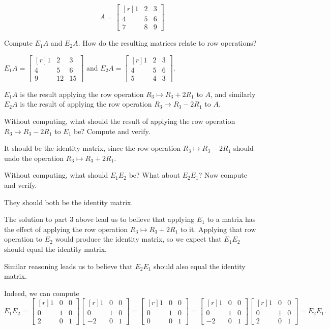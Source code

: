 \documentclass{problemset}
\newcommand{\mat}[1]{\begin{bmatrix*}[r]#1\end{bmatrix*}}
\begin{document}
	\[
		A=\mat{1&2&3\\4&5&6\\7&8&9}
	\]
	\begin{parts}[resume]
		\item Compute $E_1A$ and $E_2A$. How do the resulting matrices relate to row
		operations?
			\begin{solution}
				$E_1A=\mat{1&2&3\\4&5&6\\9&12&15}$ and $E_2A=\mat{1&2&3\\4&5&6\\5&4&3}$.

				$E_1A$ is the result applying the row operation $R_3\mapsto R_3+2R_1$
				to $A$, and similarly $E_2A$ is the result of applying the row
				operation $R_3\mapsto R_3-2R_1$ to $A$. 
			\end{solution}
		\item Without computing, what should the result of applying the row
		operation $R_3\mapsto R_3-2R_1$ to $E_1$ be? Compute and verify.
			\begin{solution}
				It should be the identity matrix, since the row operation
				$R_3\mapsto R_3-2R_1$ should undo the operation $R_3\mapsto R_3+2R_1$.
			\end{solution}
		\item Without computing, what should $E_1E_2$ be? What about $E_2E_1$?
		Now compute and verify.
			\begin{solution}
				They should both be the identity matrix. 

				The solution to part 3 above lead us to believe that applying $E_1$
				to a matrix has the effect of applying the row operation $R_3\mapsto R_3+2R_1$
				to it. Applying that row operation to $E_2$ would produce the
				identity matrix, so we expect that $E_1E_2$ should equal the
				identity matrix. 

				Similar reasoning leads us to believe that $E_2E_1$ should also
				equal the identity matrix. 

				Indeed, we can compute
				\[
					E_1E_2
					=\mat{1&0&0\\0&1&0\\2&0&1}\mat{1&0&0\\0&1&0\\-2&0&1}
					=\mat{1&0&0\\0&1&0\\0&0&1}
					=\mat{1&0&0\\0&1&0\\-2&0&1}\mat{1&0&0\\0&1&0\\2&0&1}
					=E_2E_1.
				\]
			\end{solution}
	\end{parts}
\end{document}
